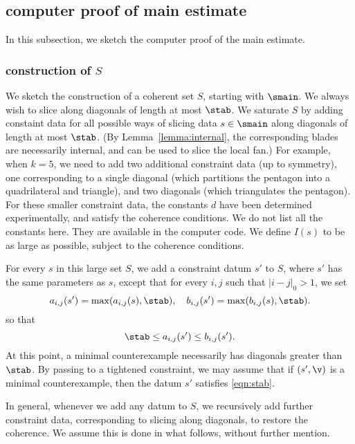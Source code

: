 \subsection{computer proof of main estimate}

In this subsection, we sketch the computer proof of the main estimate.

\subsubsection{construction of $S$}

We sketch the construction of a coherent set $S$, starting with $\smain$.
We always wish to slice along diagonals of length at most $\stab$. 
We saturate $S$ by adding constaint data for
all possible ways of  slicing data $s\in \smain$
along diagonals of length at most $\stab$.  (By Lemma~\ref{lemma:internal}, the
corresponding blades are necessarily internal, and can be used to
slice the local fan.)  For example, when $k=5$, we need to add two
additional constraint data (up to symmetry), one corresponding to a
single diagonal (which partitions the pentagon into a quadrilateral
and triangle), and two diagonals (which triangulates the pentagon).
For these smaller constraint data, the constants $d$ have been
determined experimentally, and satisfy the coherence conditions.  We
do not list all the constants here.  They are available in the
computer code.  We define $I(s)$ to be as large as possible, subject
to the coherence conditions.  

For every $s$ in this large set $S$, 
we add a constraint datum $s'$ to $S$, where $s'$ has
the same parameters as $s$, except that for every $i,j$ such that $|i-j|_0>1$,
we set
\begin{equation}\label{eqn:s'}
a_{i,j}(s') = \max(a_{i,j}(s),\stab),\quad b_{i,j}(s')=\max(b_{i,j}(s),\stab).
\end{equation}
so that
\begin{equation}\label{eqn:stab}
\stab \le a_{i,j}(s')\le b_{i,j}(s').
\end{equation}
At this point,  a minimal counterexample
necessarily has diagonals greater than $\stab$.  By passing to a tightened
constraint, we may assume that if $(s',\v)$ is a minimal counterexample,
then the datum $s'$ satisfies \eqref{eqn:stab}.

In general, whenever we add any datum to $S$, we recursively add
further constraint data, corresponding to slicing along diagonals,
to restore the coherence.  We assume this is done in what follows, without
further mention.

